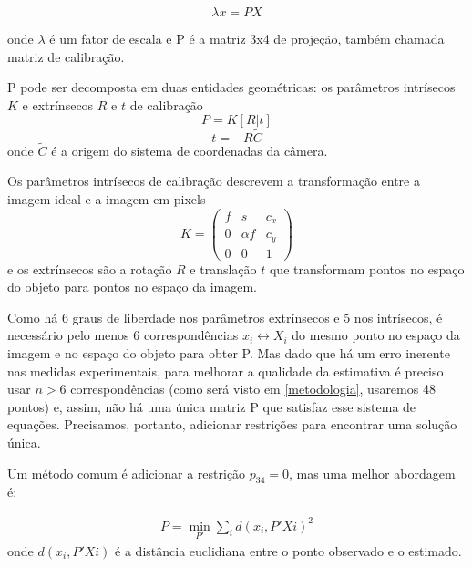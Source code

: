 \documentclass[conference]{IEEEtran}
\begin{document}
\begin{equation}\lambda  x = P  X\label{eq:P_X}\end{equation}

onde \(\lambda\) é um fator de escala e P é a matriz 3x4 de projeção, também chamada matriz de calibração.

P pode ser decomposta em duas entidades geométricas: os parâmetros intrísecos \(K\) e extrínsecos \(R\) e \(t\) de calibração\cite{tese}
\begin{equation}
P = K [R | t]
\end{equation}
\begin{equation}
t = -R\widetilde{C}
\end{equation}
onde \(\widetilde{C}\) é a origem do sistema de coordenadas da câmera\cite{Hartley2004}.

Os parâmetros intrísecos de calibração descrevem a transformação entre a imagem ideal e a imagem em pixels
\begin{equation}
K = \begin{pmatrix} 
f & s & c_x \\
0 & \alpha f & c_y\\
0 & 0 & 1
\end{pmatrix}
\end{equation}
e os extrínsecos são a rotação \(R\) e translação \(t\) que transformam pontos no espaço do objeto para pontos no espaço da imagem\cite{tese}.

Como há 6 graus de liberdade nos parâmetros extrínsecos e 5 nos intrísecos, é necessário pelo menos 6 correspondências \({x_i \leftrightarrow X_i}\) do mesmo ponto no espaço da imagem e no espaço do objeto para obter P\cite{tese}. Mas dado que há um erro inerente nas medidas experimentais, para melhorar a qualidade da estimativa é preciso usar \(n > 6\) correspondências (como será visto em \ref{metodologia}, usaremos 48 pontos) e, assim, não há uma única matriz P que satisfaz esse sistema de equações. Precisamos, portanto, adicionar restrições para encontrar uma solução única.  

Um método comum é adicionar a restrição \(p_{34} = 0\)\cite{Hartley2004}, mas uma melhor abordagem\cite{tese} é:

\begin{equation}
\begin{aligned}
P = \min_{P'} \sum_{i}d(x_i, P'Xi)^2
\end{aligned}
\end{equation}
onde \(d(x_i, P'Xi) \) é a distância euclidiana entre o ponto observado e o estimado. 
\end{document}

